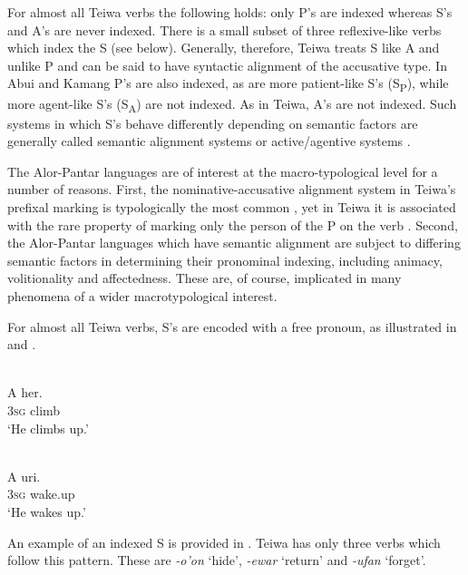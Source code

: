 For almost all Teiwa verbs the following holds: only P's are indexed whereas S's and A's are never indexed. There is a small subset of three reflexive-like verbs which index the S (see below). Generally, therefore, Teiwa treats S like A and unlike P and can be said to have syntactic alignment of the accusative type. In Abui and Kamang P's are also indexed, as are more patient-like S's (S\textsubscript{P}), while more agent-like S's (S\textsubscript{A}) are not indexed. As in Teiwa, A's are not indexed. Such systems in which S's behave differently depending on semantic factors are generally called semantic alignment systems \citep{DonohueEtAl2008} or active/agentive systems \citep{Mithun1991}.

The Alor-Pantar languages are of interest at the macro-typological level for a number of reasons. First, the nominative-accusative alignment system in Teiwa's prefixal marking is typologically the most common \citep[53]{Siewierska2004}, yet in Teiwa it is associated with the rare property of marking only the person of the P on the verb \citep{Siewierska2013}. Second, the Alor-Pantar languages which have semantic alignment are subject to differing semantic factors in determining their pronominal indexing, including animacy, volitionality and affectedness. These are, of course, implicated in many phenomena of a wider macrotypological interest.

For almost all Teiwa verbs, S's are encoded with a free pronoun, as illustrated in  and .


\ea 
\label{ex:10:1234}
 \\
 \gll    A   her. \\
   3\textsc{sg}  climb \\
  \glt `He climbs up.'
\z



\ea%
\label{bkm:Ref383697262}
 \\
\gll       A  uri.\\  
     3\textsc{sg} wake.up \\
\glt  `He wakes up.'
\z







An example of an indexed S is provided in . Teiwa has only three verbs which follow this pattern. These are \textit{{}-o'on} `hide', \textit{{}-ewar} `return' and \textit{{}-ufan} `forget'. 


